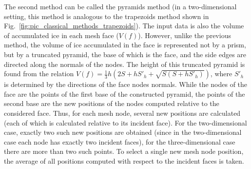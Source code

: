 \documentclass[
11pt,%
tightenlines,%
twoside,%
onecolumn,%
nofloats,%
nobibnotes,%
nofootinbib,%
superscriptaddress,%
noshowpacs,%
centertags]%
{revtex4-2}
\begin{document}
The second method can be called the pyramids method (in a two-dimensional setting, this method is analogous to the trapezoids method shown in Fig.~\ref{fig:pic_classical_methods_trapezoids}).
The input data is also the volume of accumulated ice in each mesh face ($V(f)$).
However, unlike the previous method, the volume of ice accumulated in the face is represented not by a prism, but by a truncated pyramid, the base of which is the face, and the side edges are directed along the normals of the nodes.
The height of this truncated pyramid is found from the relation $V(f) = \frac{1}{3} h (2S + hS'_h + \sqrt{S(S + hS'_h)})$, where $S'_h$ is determined by the directions of the face nodes normals.
While the nodes of the face are the points of the first base of the constructed pyramid, the points of the second base are the new positions of the nodes computed relative to the considered face.
Thus, for each mesh node, several new positions are calculated (each of which is calculated relative to its incident face).
For the two-dimensional case, exactly two such new positions are obtained (since in the two-dimensional case each node has exactly two incident faces), for the three-dimensional case there are more than two such points.
To select a single new mesh node position, the average of all positions computed with respect to the incident faces is taken.
\end{document}
